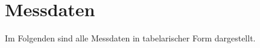 \section{Messdaten}
\label{sec:Messdaten}
Im Folgenden sind alle Messdaten in tabelarischer Form dargestellt.

